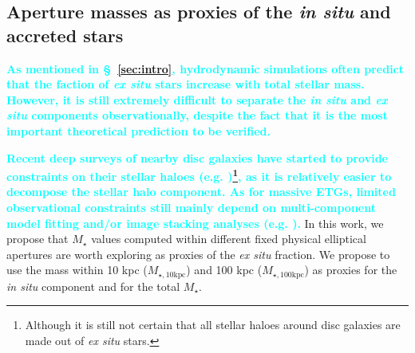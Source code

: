 \documentclass[fleqn,usenatbib]{mnras}
\def\mstar{{$M_{\star}$}}
\def\minn{{$M_{\star,10\mathrm{kpc}}$}}
\def\mtot{{$M_{\star,100\mathrm{kpc}}$}}
\newcommand{\song}[1]{\textcolor{cyan}{\textbf{#1}}}
\begin{document}
\subsection{Aperture masses as proxies of the \textit{in situ} and accreted stars}
    \label{ssec:insitu}
    
    \song{
    As mentioned in \S~\ref{sec:intro}, hydrodynamic simulations often predict that 
    the faction of \textit{ex situ} stars increase with total stellar mass.
    However, it is still extremely difficult to separate the \textit{in situ} and
    \textit{ex situ} components observationally, despite the fact that it is the most 
    important theoretical prediction to be verified. 
    }
    
    \song{
    Recent deep surveys of nearby disc galaxies have started to provide constraints 
    on their stellar haloes (e.g. \citealt{Courteau2011, Merritt2016, 
    Harmsen2017})\footnote{Although it is still not certain that all stellar haloes
    around disc galaxies are made out of \textit{ex situ} stars.}, as it is
    relatively easier to decompose the stellar halo component. 
    As for massive ETGs, limited observational constraints still mainly depend on 
    multi-component model fitting and/or image stacking analyses 
    (e.g. \citealt{Gonzalez2007, Huang2013a, DSouza2014, Spavone2017}).
    }
    In this work, we propose that \mstar{} values computed within different fixed 
    physical elliptical apertures are worth exploring as proxies of the 
    \textit{ex situ} fraction. 
    We propose to use the mass within 10 kpc (\minn{}) and 100 kpc (\mtot{}) as 
    proxies for the \textit{in situ} component and for the total \mstar{}. 
    
\end{document}
